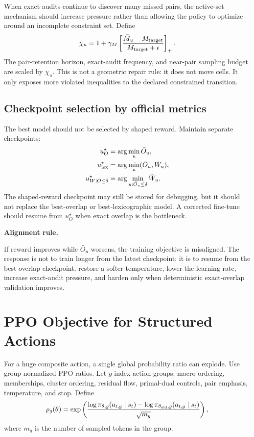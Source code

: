 \documentclass[11pt]{article}
\newcommand{\callout}[3]{%
\medskip\noindent\textbf{\textcolor{#1}{#2.}}\par\noindent #3\par\medskip
}
\begin{document}
When exact audits continue to discover many missed pairs, the active-set mechanism should increase pressure rather than allowing the policy to optimize around an incomplete constraint set. Define
\[
    \chi_u=1+\gamma_M\left[\frac{\bar M_u-M_{\rm target}}{M_{\rm target}+\epsilon}\right]_+.
\]
The pair-retention horizon, exact-audit frequency, and near-pair sampling budget are scaled by $\chi_u$. This is not a geometric repair rule: it does not move cells. It only exposes more violated inequalities to the declared constrained transition.

\subsection{Checkpoint selection by official metrics}

The best model should not be selected by shaped reward. Maintain separate checkpoints:
\[
\begin{aligned}
    u_O^{\star} &= \arg\min_u \bar O_u,\\
    u_{\rm lex}^{\star} &= \arg\min_u (\bar O_u,\bar W_u),\\
    u_{W\mid O\le \delta}^{\star} &= \arg\min_{u:\bar O_u\le\delta}\bar W_u.
\end{aligned}
\]
The shaped-reward checkpoint may still be stored for debugging, but it should not replace the best-overlap or best-lexicographic model. A corrected fine-tune should resume from $u_O^{\star}$ when exact overlap is the bottleneck.

\callout{red!75!black}{Alignment rule}{If reward improves while $\bar O_u$ worsens, the training objective is misaligned. The response is not to train longer from the latest checkpoint; it is to resume from the best-overlap checkpoint, restore a softer temperature, lower the learning rate, increase exact-audit pressure, and harden only when deterministic exact-overlap validation improves.}

\section{PPO Objective for Structured Actions}

For a huge composite action, a single global probability ratio can explode. Use group-normalized PPO ratios. Let $g$ index action groups: macro ordering, memberships, cluster ordering, residual flow, primal-dual controls, pair emphasis, temperature, and stop. Define
\[
    \rho_g(\theta)=\exp\left(
    \frac{
    \log\pi_{\theta,g}(a_{t,g}\mid s_t)-
    \log\pi_{\theta_{\rm old},g}(a_{t,g}\mid s_t)
    }{\sqrt{m_g}}
    \right),
\]
where $m_g$ is the number of sampled tokens in the group.
\end{document}
